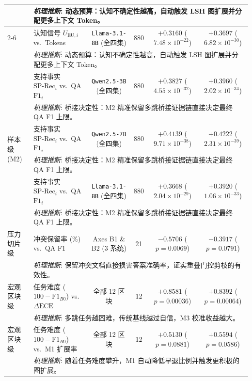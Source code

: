 \documentclass[11pt]{article}
\begin{document}
\begin{table}[t]
{\begin{tabular}{llcccc}
& \multicolumn{5}{l}{\quad\textit{机理推断}: 动态预算：认知不确定性越高，自动触发 LSH 图扩展并分配更多上下文 Token。} \\
\cmidrule(lr){2-6}
 & 认知信号 $U_{\text{EU}, i}$ vs.\ Tokens & \texttt{Llama-3.1-8B} (全四集) & 880 & $\mathbf{+0.3160}$ ($7.48 \times 10^{-22}$) & $\mathbf{+0.3697}$ ($6.82 \times 10^{-30}$) \\
& \multicolumn{5}{l}{\quad\textit{机理推断}: 动态预算：认知不确定性越高，自动触发 LSH 图扩展并分配更多上下文 Token。} \\
\midrule
\multirow{6}{*}{样本级 (M2)} & 支持事实 $\text{SP-Rec}_i$ vs.\ QA $\text{F1}_i$ & \texttt{Qwen2.5-3B} (全四集) & 880 & $\mathbf{+0.3827}$ ($4.55 \times 10^{-32}$) & $\mathbf{+0.3960}$ ($2.02 \times 10^{-34}$) \\
& \multicolumn{5}{l}{\quad\textit{机理推断}: 桥接决定性：M2 精准保留多跳桥接证据链直接决定最终 QA F1 上限。} \\
\cmidrule(lr){2-6}
 & 支持事实 $\text{SP-Rec}_i$ vs.\ QA $\text{F1}_i$ & \texttt{Qwen2.5-7B} (全四集) & 880 & $\mathbf{+0.4139}$ ($9.71 \times 10^{-38}$) & $\mathbf{+0.4222}$ ($2.31 \times 10^{-39}$) \\
& \multicolumn{5}{l}{\quad\textit{机理推断}: 桥接决定性：M2 精准保留多跳桥接证据链直接决定最终 QA F1 上限。} \\
\cmidrule(lr){2-6}
 & 支持事实 $\text{SP-Rec}_i$ vs.\ QA $\text{F1}_i$ & \texttt{Llama-3.1-8B} (全四集) & 880 & $\mathbf{+0.3668}$ ($2.04 \times 10^{-29}$) & $\mathbf{+0.3920}$ ($1.06 \times 10^{-33}$) \\
& \multicolumn{5}{l}{\quad\textit{机理推断}: 桥接决定性：M2 精准保留多跳桥接证据链直接决定最终 QA F1 上限。} \\
\midrule
压力切片级 & 冲突保留率 (\%) vs.\ QA F1 & Axes B1 \& B2 (3 系统) & 21 & $\mathbf{-0.5706}$ ($p = 0.0069$) & $-0.3917$ ($p = 0.0791$) \\
& \multicolumn{5}{l}{\quad\textit{机理推断}: 保留冲突文档直接损害答案准确率，证实重叠门控剪枝的有效性。} \\
\midrule
宏观区块级 & 任务难度 ($100-\text{F1}_{B0}$) vs.\ $\Delta\text{ECE}$ & 全部 12 区块 & 12 & $\mathbf{+0.8581}$ ($p = 0.00036$) & $\mathbf{+0.8392}$ ($p = 0.00064$) \\
& \multicolumn{5}{l}{\quad\textit{机理推断}: 多跳任务越困难，传统基线越过自信，M3 校准收益越大。} \\
\addlinespace[2pt]
宏观区块级 & 任务难度 ($100-\text{F1}_{B0}$) vs.\ M1 扩展率 & 全部 12 区块 & 12 & $+0.5130$ ($p = 0.0881$) & $+0.5594$ ($p = 0.0586$) \\
& \multicolumn{5}{l}{\quad\textit{机理推断}: 随着任务难度攀升，M1 自动降低早退比例并触发更积极的图扩展。} \\
\bottomrule
\end{tabular}
}
\end{table}
\end{document}

